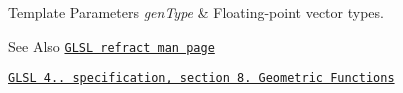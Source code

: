 \begin{DoxyTemplParams}{Template Parameters}
{\em gen\-Type} & Floating-\/point vector types.\\
\hline
\end{DoxyTemplParams}
\begin{DoxySeeAlso}{See Also}
\href{http://www.opengl.org/sdk/docs/manglsl/xhtml/refract.xml}{\tt G\-L\-S\-L refract man page} 

\href{http://www.opengl.org/registry/doc/GLSLangSpec.4.20.8.pdf}{\tt G\-L\-S\-L 4.. specification, section 8. Geometric Functions} 
\end{DoxySeeAlso}
